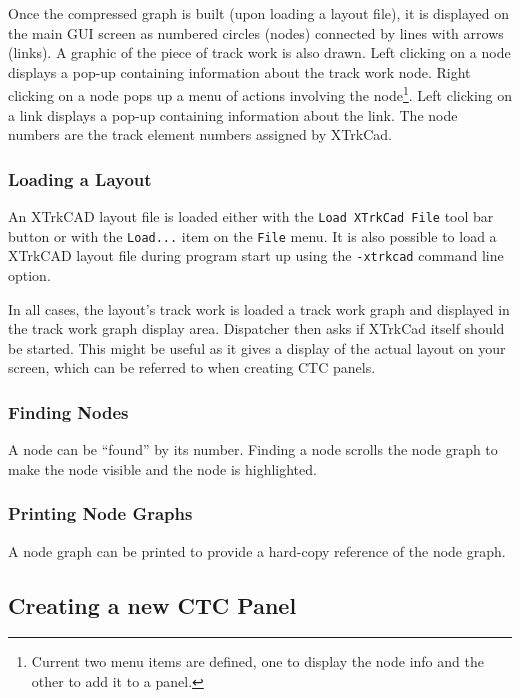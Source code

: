 Once the compressed graph is built (upon loading a layout file), it is
displayed on the main GUI screen as numbered circles (nodes) connected
by lines with arrows (links).  A graphic of the piece of track work is
also drawn. Left clicking on a node displays a pop-up containing
information about the track work node.  Right clicking on a node pops up
a menu of actions involving the node\footnote{Current two menu items
are defined, one to display the node info and the other to add it to a
panel.}. Left clicking on a link displays a pop-up containing
information about the link.  The node numbers are the track element
numbers assigned by XTrkCad.

\subsubsection{Loading a Layout}

An XTrkCAD layout file is loaded either with the \verb=Load XTrkCad File=
tool bar button or with the \verb=Load...= item on the \verb=File=
menu. It is also possible to load a XTrkCAD layout file during
program start up using the \verb=-xtrkcad= command line option.

In all cases, the layout's track work is loaded a track work graph and
displayed in the track work graph display area.  Dispatcher then asks if
XTrkCad itself should be started.  This might be useful as it gives a
display of the actual layout on your screen, which can be referred to
when creating CTC panels.

\subsubsection{Finding Nodes}

A node can be ``found'' by its number.  Finding a node scrolls the node
graph to make the node visible and the node is highlighted.

\subsubsection{Printing Node Graphs}

A node graph can be printed to provide a hard-copy reference of the node
graph.

\subsection{Creating a new CTC Panel}
\label{sect:dispatcher:creatingCTCPanels}

